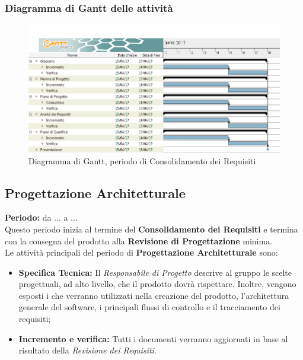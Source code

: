 	\subsubsection{Diagramma di Gantt delle attività}
	\begin{figure}[H]
		\centering
		\includegraphics[width=1\linewidth]{immagini/gantt/consolidamento_requisiti.png}
		\caption{Diagramma di Gantt, periodo di Consolidamento dei Requisiti}
	\end{figure}
	\subsection{Progettazione Architetturale}
	\textbf{Periodo:} da ... a ... \\
	Questo periodo inizia al termine del \textbf{Consolidamento dei Requisiti} e termina con la consegna del prodotto alla \textbf{Revisione di Progettazione} minima. \\
	Le attività principali del periodo di \textbf{Progettazione Architetturale} sono: \\
	\begin{itemize}
		\item \textbf{Specifica Tecnica:} Il \textit{Responsabile di Progetto} descrive al gruppo le scelte progettuali, ad alto livello, che il prodotto dovrà rispettare. Inoltre, vengono esposti i  che verranno utilizzati nella creazione del prodotto, l'architettura generale del software, i principali flussi di controllo e il tracciamento dei requisiti; \\
		\item \textbf{Incremento e verifica:} Tutti i documenti verranno aggiornati in base al risultato
della \textit{Revisione dei Requisiti}. \\
	\end{itemize}
